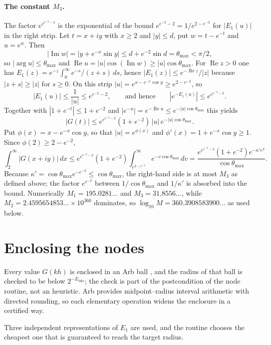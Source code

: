 \documentclass[11pt,a4paper]{article}
\theoremstyle{remark}
\newcommand{\Eone}{E_1}
\begin{document}
\paragraph{The constant $M_3$.}
The factor $e^{e^{e^{-2}-2}}$ is the exponential of the bound
$e^{e^{-2}-2}=1/e^{2-e^{-2}}$ for $|E_1(u)|$ in the right strip.
Let $t=x+iy$ with $x\ge2$ and $|y|\le d$, put $w=t-e^{-t}$ and
$u=e^{w}$. Then
\[
  |\operatorname{Im}w|=|y+e^{-x}\sin y|
  \le d+e^{-2}\sin d=\theta_{\max}<\pi/2,
\]
so $|\arg u|\le\theta_{\max}$ and
$\operatorname{Re}u=|u|\cos(\operatorname{Im}w)\ge|u|\cos\theta_{\max}$.
For $\operatorname{Re}z>0$ one has
$E_1(z)=e^{-z}\int_0^\infty e^{-s}/(z+s)\,ds$, hence
$|E_1(z)|\le e^{-\operatorname{Re}z}/|z|$ because
$|z+s|\ge|z|$ for $s\ge0$. On this strip
$|u|=e^{x-e^{-x}\cos y}\ge e^{2-e^{-2}}$, so
\[
  |E_1(u)|\le\frac{1}{|u|}\le e^{e^{-2}-2},
  \qquad\text{and hence}\qquad
  |e^{-E_1(u)}|\le e^{e^{e^{-2}-2}} .
\]
Together with $|1+e^{-t}|\le1+e^{-2}$ and
$|e^{-u}|=e^{-\operatorname{Re}u}\le e^{-|u|\cos\theta_{\max}}$ this
yields
\[
  |G(t)|\le e^{e^{e^{-2}-2}}(1+e^{-2})\,|u|\,
  e^{-|u|\cos\theta_{\max}} .
\]
Put $\phi(x)=x-e^{-x}\cos y$, so that $|u|=e^{\phi(x)}$ and
$\phi'(x)=1+e^{-x}\cos y\ge1$. Since $\phi(2)\ge2-e^{-2}$,
\[
  \int_2^\infty|G(x+iy)|\,dx
  \le e^{e^{e^{-2}-2}}(1+e^{-2})
  \int_{e^{2-e^{-2}}}^\infty e^{-v\cos\theta_{\max}}\,dv
  =\frac{e^{e^{e^{-2}-2}}(1+e^{-2})e^{-\kappa'e^2}}
        {\cos\theta_{\max}} .
\]
Because $\kappa'=\cos\theta_{\max}e^{-e^{-2}}\le\cos\theta_{\max}$,
the right-hand side is at most $M_3$ as defined above; the factor
$e^{e^{-2}}$ between $1/\cos\theta_{\max}$ and $1/\kappa'$ is absorbed
into the bound. Numerically $M_1=195.0281\ldots$ and
$M_3=31.8556\ldots$, while $M_2=2.4595654853\ldots\times10^{360}$
dominates, so $\log_{10}M=360.3908583900\ldots$ as used below.

\section{Enclosing the nodes}

Every value $G(kh)$ is enclosed in an Arb ball \cite{johansson2017}, and
the radius of that ball is checked to be below $2^{-E_{\mathrm{bits}}}$;
the check is part of the postcondition of the node routine, not an
heuristic. Arb provides midpoint--radius interval arithmetic with
directed rounding, so each elementary operation widens the enclosure in
a certified way.

Three independent representations of $\Eone$ are used, and the routine
chooses the cheapest one that is guaranteed to reach the target radius.
\end{document}
